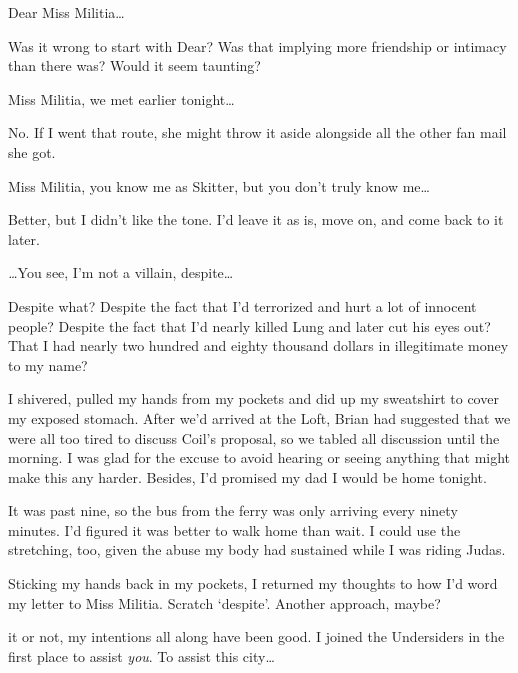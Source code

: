 





Dear Miss Militia\ldots



Was it wrong to start with Dear?  Was that implying more friendship or intimacy than there was?  Would it seem taunting?



Miss Militia, we met earlier tonight\ldots



No.  If I went that route, she might throw it aside alongside all the other fan mail she got.



Miss Militia, you know me as Skitter, but you don't truly know me\ldots



Better, but I didn't like the tone.  I'd leave it as is, move on, and come back to it later.



\emph{\ldots}You see, I'm not a villain, despite\ldots



Despite what?  Despite the fact that I'd terrorized and hurt a lot of innocent people?  Despite the fact that I'd nearly killed Lung and later cut his eyes out?  That I had nearly two hundred and eighty thousand dollars in illegitimate money to my name?



I shivered, pulled my hands from my pockets and did up my sweatshirt to cover my exposed stomach.  After we'd arrived at the Loft, Brian had suggested that we were all too tired to discuss Coil's proposal, so we tabled all discussion until the morning.  I was glad for the excuse to avoid hearing or seeing anything that might make this any harder.  Besides, I'd promised my dad I would be home tonight.



It was past nine, so the bus from the ferry was only arriving every ninety minutes.  I'd figured it was better to walk home than wait.  I could use the stretching, too, given the abuse my body had sustained while I was riding Judas.



Sticking my hands back in my pockets, I returned my thoughts to how I'd word my letter to Miss Militia.  Scratch `despite'.  Another approach, maybe?



\ldotsBelieve it or not, my intentions all along have been good.  I joined the Undersiders in the first place to assist \emph{you}.  To assist this city\ldots



